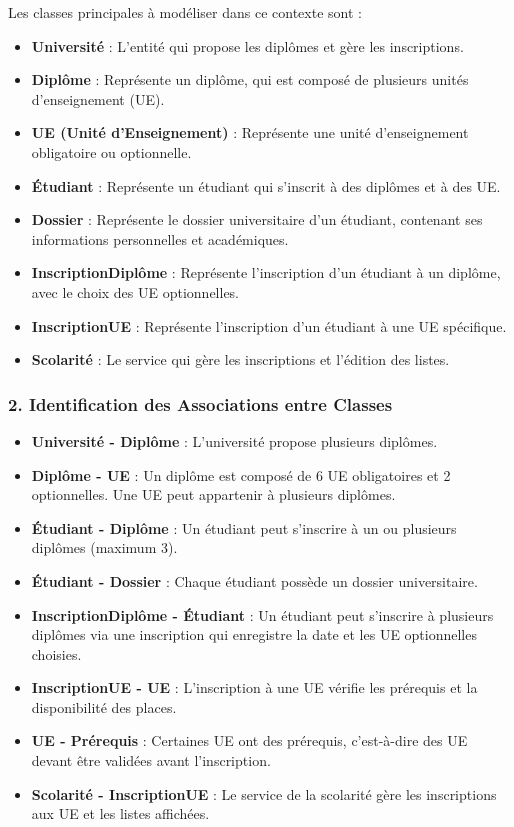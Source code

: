 \documentclass{article}
\begin{document}
Les classes principales à modéliser dans ce contexte sont :

\begin{itemize}
  \item \textbf{Université} : L'entité qui propose les diplômes et gère les inscriptions.
  \item \textbf{Diplôme} : Représente un diplôme, qui est composé de plusieurs unités d'enseignement (UE).
  \item \textbf{UE (Unité d'Enseignement)} : Représente une unité d'enseignement obligatoire ou optionnelle.
  \item \textbf{Étudiant} : Représente un étudiant qui s'inscrit à des diplômes et à des UE.
  \item \textbf{Dossier} : Représente le dossier universitaire d'un étudiant, contenant ses informations personnelles et académiques.
  \item \textbf{InscriptionDiplôme} : Représente l'inscription d'un étudiant à un diplôme, avec le choix des UE optionnelles.
  \item \textbf{InscriptionUE} : Représente l'inscription d'un étudiant à une UE spécifique.
  \item \textbf{Scolarité} : Le service qui gère les inscriptions et l’édition des listes.
\end{itemize}

\subsubsection*{2. Identification des Associations entre Classes}

\begin{itemize}
  \item \textbf{Université - Diplôme} : L’université propose plusieurs diplômes.
  \item \textbf{Diplôme - UE} : Un diplôme est composé de 6 UE obligatoires et 2 optionnelles. Une UE peut appartenir à plusieurs diplômes.
  \item \textbf{Étudiant - Diplôme} : Un étudiant peut s’inscrire à un ou plusieurs diplômes (maximum 3).
  \item \textbf{Étudiant - Dossier} : Chaque étudiant possède un dossier universitaire.
  \item \textbf{InscriptionDiplôme - Étudiant} : Un étudiant peut s’inscrire à plusieurs diplômes via une inscription qui enregistre la date et les UE optionnelles choisies.
  \item \textbf{InscriptionUE - UE} : L’inscription à une UE vérifie les prérequis et la disponibilité des places.
  \item \textbf{UE - Prérequis} : Certaines UE ont des prérequis, c’est-à-dire des UE devant être validées avant l'inscription.
  \item \textbf{Scolarité - InscriptionUE} : Le service de la scolarité gère les inscriptions aux UE et les listes affichées.
\end{itemize}
\end{document}
